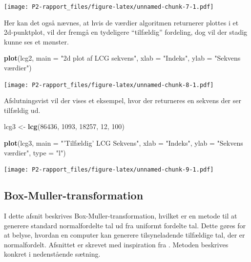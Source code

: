 \documentclass[
]{book}
\newenvironment{Shaded}{\begin{snugshade}}{\end{snugshade}}
\newcommand{\DataTypeTok}[1]{\textcolor[rgb]{0.13,0.29,0.53}{#1}}
\newcommand{\DecValTok}[1]{\textcolor[rgb]{0.00,0.00,0.81}{#1}}
\newcommand{\KeywordTok}[1]{\textcolor[rgb]{0.13,0.29,0.53}{\textbf{#1}}}
\newcommand{\NormalTok}[1]{#1}
\newcommand{\StringTok}[1]{\textcolor[rgb]{0.31,0.60,0.02}{#1}}
\theoremstyle{definition}
\theoremstyle{definition}
\theoremstyle{definition}
\theoremstyle{remark}
\begin{document}
\texttt{[image: P2-rapport\_files/figure-latex/unnamed-chunk-7-1.pdf]}

Her kan det også nævnes, at hvis de værdier algoritmen returnerer plottes i et 2d-punktplot, vil der fremgå en tydeligere ``tilfældig'' fordeling, dog vil der stadig kunne ses et mønster.

\begin{Shaded}
\begin{Highlighting}[]
\KeywordTok{plot}\NormalTok{(lcg2, }\DataTypeTok{main =} \StringTok{"2d plot af LCG sekvens"}\NormalTok{, }\DataTypeTok{xlab =} \StringTok{"Indeks"}\NormalTok{, }
     \DataTypeTok{ylab =} \StringTok{"Sekvens værdier"}\NormalTok{)}
\end{Highlighting}
\end{Shaded}

\texttt{[image: P2-rapport\_files/figure-latex/unnamed-chunk-8-1.pdf]}

Afslutningsvist vil der vises et eksempel, hvor der returneres en sekvens der ser tilfældig ud.

\begin{Shaded}
\begin{Highlighting}[]
\NormalTok{lcg3 <-}\StringTok{ }\KeywordTok{lcg}\NormalTok{(}\DecValTok{86436}\NormalTok{, }\DecValTok{1093}\NormalTok{, }\DecValTok{18257}\NormalTok{, }\DecValTok{12}\NormalTok{, }\DecValTok{100}\NormalTok{)}

\KeywordTok{plot}\NormalTok{(lcg3, }\DataTypeTok{main =} \StringTok{"'Tilfældig' LCG Sekvens"}\NormalTok{, }\DataTypeTok{xlab =} \StringTok{"Indeks"}\NormalTok{, }
     \DataTypeTok{ylab =} \StringTok{"Sekvens værdier"}\NormalTok{, }\DataTypeTok{type =} \StringTok{"l"}\NormalTok{)}
\end{Highlighting}
\end{Shaded}

\texttt{[image: P2-rapport\_files/figure-latex/unnamed-chunk-9-1.pdf]}

\hypertarget{box-muller-transformation}{%
\subsection{Box-Muller-transformation}\label{box-muller-transformation}}

I dette afsnit beskrives Box-Muller-transformation, hvilket er en metode til at generere standard normalfordelte tal ud fra uniformt fordelte tal. Dette gøres for at belyse, hvordan en computer kan generere tilsyneladende tilfældige tal, der er normalfordelt. Afsnittet er skrevet med inspiration fra \citep{Box-Muller}. Metoden beskrives konkret i nedenstående sætning.
\end{document}
